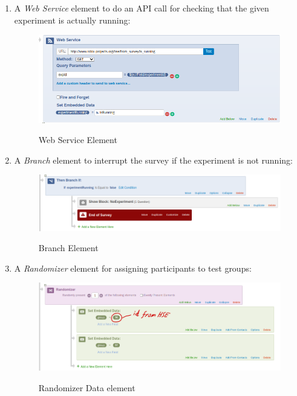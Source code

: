 \documentclass[a4paper]{usiinfbachelorproject}
\begin{document}
\begin{appendices}
\begin{enumerate}
        \item
            A \emph{Web Service} element to do an API call for checking that the given experiment is actually running:

            \begin{figure} [h]
            \centering
            \includegraphics[width=.9\textwidth]{figures/qflow2}
            \label{fig:qflow2} 
            \caption[]{Web Service Element}
            \end{figure}

        \newpage

        \item
            A \emph{Branch} element to interrupt the survey if the experiment is not running:

            \begin{figure} [h]
            \centering
            \includegraphics[width=.9\textwidth]{figures/qflow3}
            \label{fig:qflow3} 
            \caption[]{Branch Element}
            \end{figure}

        \item
            A \emph{Randomizer} element for assigning participants to test groups:

            \begin{figure} [h]
            \centering
            \includegraphics[width=.9\textwidth]{figures/qflow4}
            \label{fig:qflow4} 
            \caption[]{Randomizer Data element}
            \end{figure}


\end{enumerate}
\end{appendices}
\end{document}
